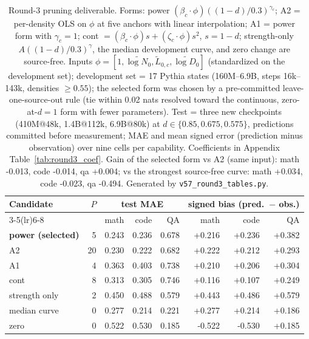 \begin{table}[t]\centering\footnotesize\setlength{\tabcolsep}{3pt}
\begin{tabular}{@{}lrrrrrrr@{}}
\toprule
Candidate & $P$ & \multicolumn{3}{c}{test MAE} & \multicolumn{3}{c}{signed bias (pred.\ $-$ obs.)} \\
\cmidrule(lr){3-5}\cmidrule(lr){6-8}
 & & math & code & QA & math & code & QA \\
\midrule
\textbf{power (selected)} & 5 & 0.243 & 0.236 & 0.678 & +0.216 & +0.236 & +0.382 \\
A2 & 20 & 0.230 & 0.222 & 0.682 & +0.222 & +0.212 & +0.293 \\
A1 & 4 & 0.363 & 0.403 & 0.738 & +0.210 & +0.206 & +0.304 \\
cont & 8 & 0.313 & 0.305 & 0.746 & +0.116 & +0.107 & +0.249 \\
strength only & 2 & 0.450 & 0.488 & 0.579 & +0.443 & +0.486 & +0.579 \\
median curve & 0 & 0.277 & 0.214 & 0.221 & +0.277 & +0.214 & +0.186 \\
zero & 0 & 0.522 & 0.530 & 0.185 & -0.522 & -0.530 & +0.185 \\
\bottomrule\end{tabular}
\caption{Round-3 pruning deliverable. Forms: power $(\beta_c\cdot\phi)((1-d)/0.3)^{\gamma_c}$; A2 = per-density OLS on $\phi$ at five anchors with linear interpolation; A1 = power form with $\gamma_c{=}1$; cont $=(\beta_c\cdot\phi)s+(\zeta_c\cdot\phi)s^2$, $s{=}1{-}d$; strength-only $A((1-d)/0.3)^{\gamma}$, the median development curve, and zero change are source-free. Inputs $\phi=[1,\tilde{\log N_0},\tilde L_{0,c},\tilde{\log D_0}]$ (standardized on the development set); development set = 17 Pythia states (160M--6.9B, steps 16k--143k, densities $\ge0.55$); the selected form was chosen by a pre-committed leave-one-source-out rule (tie within 0.02 nats resolved toward the continuous, zero-at-$d{=}1$ form with fewer parameters). Test = three new checkpoints (410M@48k, 1.4B@112k, 6.9B@80k) at $d\in\{0.85,0.675,0.575\}$, predictions committed before measurement; MAE and mean signed error (prediction minus observation) over nine cells per capability. Coefficients in Appendix Table~\ref{tab:round3_coef}. Gain of the selected form vs A2 (same input): math -0.013, code -0.014, qa +0.004; vs the strongest source-free curve: math +0.034, code -0.023, qa -0.494. Generated by \texttt{v57\_round3\_tables.py}.}
\label{tab:round3_prune}\end{table}
